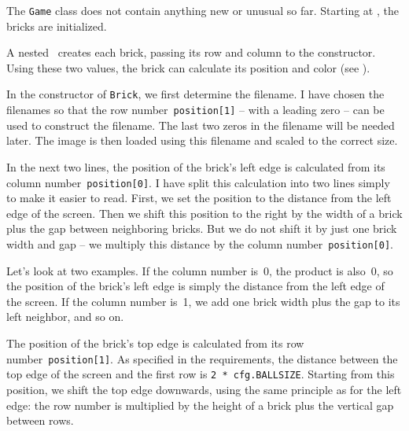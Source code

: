 
The \texttt{Game} class does not contain anything new or unusual so far. Starting at , the bricks are initialized. 

A nested \forSchleife\ creates each brick, passing its row and column to the constructor. Using these two values, the brick can calculate its position and color (see ).

\newpage
{}


\begin{figure}%
	\begin{center}%
		\vspace{-6ex}%
	\end{center}%
\end{figure}%
In the constructor of \texttt{Brick}, we first determine the filename. I have chosen the filenames so that the row number~\texttt{position[1]} -- with a leading zero -- can be used to construct the filename. The last two zeros in the filename will be needed later. The image is then loaded using this filename and scaled to the correct size.

In the next two lines, the position of the brick's left edge is calculated from its column number~\texttt{position[0]}. I have split this calculation into two lines simply to make it easier to read. First, we set the position to the distance from the left edge of the screen. Then we shift this position to the right by the width of a brick plus the gap between neighboring bricks. But we do not shift it by just one brick width and gap -- we multiply this distance by the column number~\texttt{position[0]}.

Let's look at two examples. If the column number is~0, the product is also~0, so the position of the brick's left edge is simply the distance from the left edge of the screen. If the column number is~1, we add one brick width plus the gap to its left neighbor, and so on.

The position of the brick's top edge is calculated from its row number~\texttt{position[1]}. As specified in the requirements, the distance between the top edge of the screen and the first row is \texttt{2 * cfg.BALLSIZE}. Starting from this position, we shift the top edge downwards, using the same principle as for the left edge: the row number is multiplied by the height of a brick plus the vertical gap between rows.


